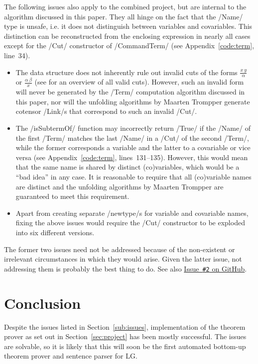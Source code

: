 \documentclass[12pt,a4paper]{article}
\begin{document}
The following issues also apply to the combined project, but are internal to the algorithm discussed in this paper. They all hinge on the fact that the \hs/Name/ type is unsafe, i.e. it does not distinguish between variables and covariables. This distinction can be reconstructed from the enclosing expression in nearly all cases except for the \hs/Cut/ constructor of \hs/CommandTerm/ (see Appendix~\ref{code:term}, line~34).
\begin{itemize}
    \item The data structure does not inherently rule out invalid cuts of the forms $\frac{x\ y}{\alpha}$ or $\frac{\alpha\ \beta}{x}$ (see \cite[p.~24]{mm12} for an overview of all valid cuts). However, such an invalid form will never be generated by the \hs/Term/ computation algorithm discussed in this paper, nor will the unfolding algorithms by Maarten Trompper generate cotensor \hs/Link/s that correspond to such an invalid \hs/Cut/.
    \item The \hs/isSubtermOf/ function may incorrectly return \hs/True/ if the \hs/Name/ of the first \hs/Term/ matches the last \hs/Name/ in a \hs/Cut/ of the second \hs/Term/, while the former corresponds a variable and the latter to a covariable or vice versa (see Appendix~\ref{code:term}, lines~131--135). However, this would mean that the same name is shared by distinct (co)variables, which would be a ``bad idea'' in any case. It is reasonable to require that all (co)variable names are distinct and the unfolding algorithms by Maarten Trompper are guaranteed to meet this requirement.
    \item Apart from creating separate \hs/newtype/s for variable and covariable names, fixing the above issues would require the \hs/Cut/ constructor to be exploded into six different versions.
\end{itemize}
The former two issues need not be addressed because of the non-existent or irrelevant circumstances in which they would arise. Given the latter issue, not addressing them is probably the best thing to do. See also \href{https://github.com/jgonggrijp/net-prove/issues/2}{Issue~\texttt{\#2} on GitHub}.


\section{Conclusion}

Despite the issues listed in Section~\ref{sub:issues}, implementation of the theorem prover as set out in Section~\ref{sec:project} has been mostly successful. The issues are solvable, so it is likely that this will soon be the first automated bottom-up theorem prover and sentence parser for LG.
\end{document}
